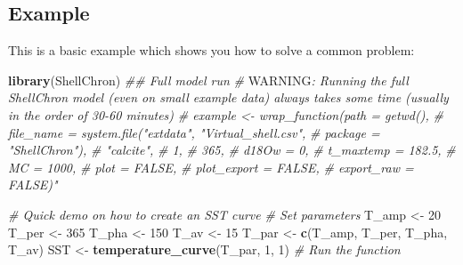 \documentclass[
]{article}
\newenvironment{Shaded}{\begin{snugshade}}{\end{snugshade}}
\newcommand{\AlertTok}[1]{\textcolor[rgb]{0.94,0.16,0.16}{#1}}
\newcommand{\CommentTok}[1]{\textcolor[rgb]{0.56,0.35,0.01}{\textit{#1}}}
\newcommand{\DecValTok}[1]{\textcolor[rgb]{0.00,0.00,0.81}{#1}}
\newcommand{\KeywordTok}[1]{\textcolor[rgb]{0.13,0.29,0.53}{\textbf{#1}}}
\newcommand{\NormalTok}[1]{#1}
\newcommand{\StringTok}[1]{\textcolor[rgb]{0.31,0.60,0.02}{#1}}
\begin{document}
\hypertarget{example}{%
\subsection{Example}\label{example}}

This is a basic example which shows you how to solve a common problem:

\begin{Shaded}
\begin{Highlighting}[]
\KeywordTok{library}\NormalTok{(ShellChron)}
\CommentTok{## Full model run}
\CommentTok{# }\AlertTok{WARNING}\CommentTok{: Running the full ShellChron model (even on small example data) always takes some time (usually in the order of 30-60 minutes)}
\CommentTok{# example <- wrap_function(path = getwd(),}
\CommentTok{#  file_name = system.file("extdata", "Virtual_shell.csv",}
\CommentTok{#  package = "ShellChron"),}
\CommentTok{#  "calcite",}
\CommentTok{#  1,}
\CommentTok{#  365,}
\CommentTok{#  d18Ow = 0,}
\CommentTok{#  t_maxtemp = 182.5,}
\CommentTok{#  MC = 1000,}
\CommentTok{#  plot = FALSE,}
\CommentTok{#  plot_export = FALSE,}
\CommentTok{#  export_raw = FALSE)"}

\CommentTok{# Quick demo on how to create an SST curve}
\CommentTok{# Set parameters}
\NormalTok{T_amp <-}\StringTok{ }\DecValTok{20}
\NormalTok{T_per <-}\StringTok{ }\DecValTok{365}
\NormalTok{T_pha <-}\StringTok{ }\DecValTok{150}
\NormalTok{T_av <-}\StringTok{ }\DecValTok{15}
\NormalTok{T_par <-}\StringTok{ }\KeywordTok{c}\NormalTok{(T_amp, T_per, T_pha, T_av)}
\NormalTok{SST <-}\StringTok{ }\KeywordTok{temperature_curve}\NormalTok{(T_par, }\DecValTok{1}\NormalTok{, }\DecValTok{1}\NormalTok{) }\CommentTok{# Run the function}
\end{Highlighting}
\end{Shaded}
\end{document}
